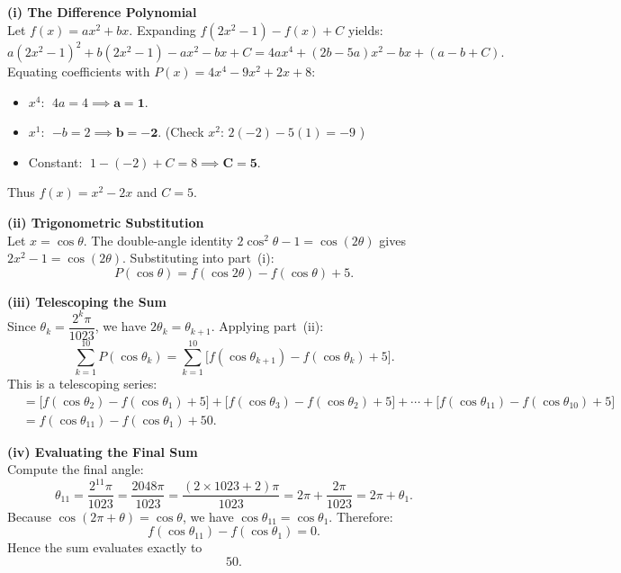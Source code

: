 \begin{solution}
\textbf{(i) The Difference Polynomial} \\
Let $f(x) = ax^2 + bx$. Expanding $f(2x^2 - 1) - f(x) + C$ yields:
\[
  a(2x^2-1)^2 + b(2x^2-1) - ax^2 - bx + C
  = 4ax^4 + (2b-5a)x^2 - bx + (a - b + C).
\]
Equating coefficients with $P(x) = 4x^4 - 9x^2 + 2x + 8$:
\begin{itemize}[leftmargin=*]
  \item $x^4$: $\;4a = 4 \implies \mathbf{a = 1}$.
  \item $x^1$: $\;{-b} = 2 \implies \mathbf{b = -2}$.
        \quad(Check $x^2$: $2(-2)-5(1)=-9$ \checkmark)
  \item Constant: $\;1-(-2)+C = 8 \implies \mathbf{C = 5}$.
\end{itemize}
Thus $\boxed{f(x) = x^2 - 2x}$ and $\boxed{C = 5}$.

\textbf{(ii) Trigonometric Substitution} \\
Let $x = \cos\theta$. The double-angle identity $2\cos^2\theta - 1 = \cos(2\theta)$ gives $2x^2 - 1 = \cos(2\theta)$. Substituting into part~(i):
\[
  \boxed{P(\cos\theta) = f(\cos 2\theta) - f(\cos\theta) + 5.}
\]

\textbf{(iii) Telescoping the Sum} \\
Since $\theta_k = \dfrac{2^k\pi}{1023}$, we have $2\theta_k = \theta_{k+1}$. Applying part~(ii):
\[
  \sum_{k=1}^{10} P(\cos\theta_k)
  = \sum_{k=1}^{10}\bigl[f(\cos\theta_{k+1}) - f(\cos\theta_k) + 5\bigr].
\]
This is a telescoping series:
\begin{align*}
  &= \bigl[f(\cos\theta_2) - f(\cos\theta_1) + 5\bigr]
   + \bigl[f(\cos\theta_3) - f(\cos\theta_2) + 5\bigr]
   + \cdots
   + \bigl[f(\cos\theta_{11}) - f(\cos\theta_{10}) + 5\bigr] \\
  &= \boxed{f(\cos\theta_{11}) - f(\cos\theta_1) + 50.}
\end{align*}

\textbf{(iv) Evaluating the Final Sum} \\
Compute the final angle:
\[
  \theta_{11} = \frac{2^{11}\pi}{1023} = \frac{2048\pi}{1023}
  = \frac{(2\times1023 + 2)\pi}{1023}
  = 2\pi + \frac{2\pi}{1023}
  = 2\pi + \theta_1.
\]
Because $\cos(2\pi + \theta) = \cos\theta$, we have $\cos\theta_{11} = \cos\theta_1$. Therefore:
\[
  f(\cos\theta_{11}) - f(\cos\theta_1) = 0.
\]
Hence the sum evaluates exactly to
\[
  \boxed{50.}
\]
\end{solution}

